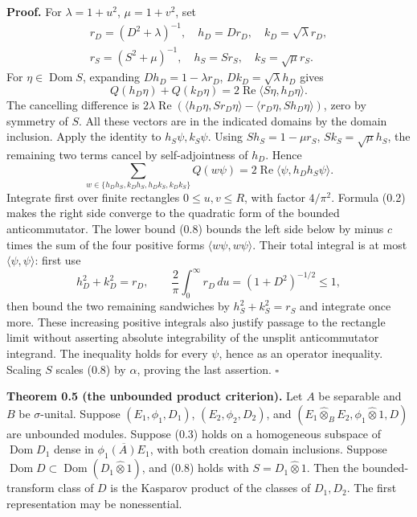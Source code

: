 \documentclass[
  11pt,
]{article}
\begin{document}
\textbf{Proof.} For \(\lambda=1+u^2\), \(\mu=1+v^2\), set \[
\begin{gathered}
r_D=(D^2+\lambda)^{-1},\quad h_D=Dr_D,\quad k_D=\sqrt\lambda r_D,\\
r_S=(S^2+\mu)^{-1},\quad h_S=Sr_S,\quad k_S=\sqrt\mu r_S.
\end{gathered}
\] For \(\eta\in\operatorname{Dom}S\), expanding \(Dh_D=1-\lambda r_D\),
\(Dk_D=\sqrt\lambda h_D\) gives \[
Q(h_D\eta)+Q(k_D\eta)=2\operatorname{Re}\langle S\eta,h_D\eta\rangle.
\] The cancelling difference is
\(2\lambda\operatorname{Re}(\langle h_D\eta,Sr_D\eta\rangle-\langle r_D\eta,Sh_D\eta\rangle)\),
zero by symmetry of \(S\). All these vectors are in the indicated
domains by the domain inclusion. Apply the identity to
\(h_S\psi,k_S\psi\). Using \(Sh_S=1-\mu r_S\), \(Sk_S=\sqrt\mu h_S\),
the remaining two terms cancel by self-adjointness of \(h_D\). Hence \[
\sum_{w\in\{h_Dh_S,k_Dh_S,h_Dk_S,k_Dk_S\}}Q(w\psi)
=2\operatorname{Re}\langle\psi,h_Dh_S\psi\rangle.
\tag{0.9}
\] Integrate first over finite rectangles \(0\leq u,v\leq R\), with
factor \(4/\pi^2\). Formula (0.2) makes the right side converge to the
quadratic form of the bounded anticommutator. The lower bound (0.8)
bounds the left side below by minus \(c\) times the sum of the four
positive forms \(\langle w\psi,w\psi\rangle\). Their total integral is
at most \(\langle\psi,\psi\rangle\): first use \[
h_D^2+k_D^2=r_D,\qquad
\frac2\pi\int_0^\infty r_D\,du=(1+D^2)^{-1/2}\leq1,
\] then bound the two remaining sandwiches by \(h_S^2+k_S^2=r_S\) and
integrate once more. These increasing positive integrals also justify
passage to the rectangle limit without asserting absolute integrability
of the unsplit anticommutator integrand. The inequality holds for every
\(\psi\), hence as an operator inequality. Scaling \(S\) scales (0.8) by
\(\alpha\), proving the last assertion. \(\square\)

\textbf{Theorem 0.5 (the unbounded product criterion).} Let \(A\) be
separable and \(B\) be \(\sigma\)-unital. Suppose \((E_1,\phi_1,D_1)\),
\((E_2,\phi_2,D_2)\), and
\((E_1\widehat\otimes_B E_2,\phi_1\widehat\otimes1,D)\) are unbounded
modules. Suppose (0.3) holds on a homogeneous subspace of
\(\operatorname{Dom}D_1\) dense in \(\overline{\phi_1(A)E_1}\), with
both creation domain inclusions. Suppose
\(\operatorname{Dom}D\subset\operatorname{Dom}(D_1\widehat\otimes1)\),
and (0.8) holds with \(S=D_1\widehat\otimes1\). Then the
bounded-transform class of \(D\) is the Kasparov product of the classes
of \(D_1,D_2\). The first representation may be nonessential.
\end{document}

